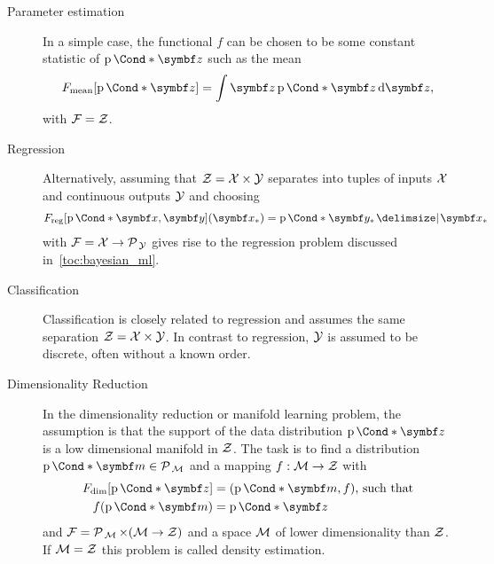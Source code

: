 \begin{problem}
\begin{description}
    \item[Parameter estimation]
          In a simple case, the functional $f$ can be chosen to be some constant statistic of $\Prob*{\mat{z}}$ such as the mean
          \begin{align}
              F_{\text{mean}}[\Prob*{\mat{z}}] = \int \mat{z} \Prob*{\mat{z}} \diff \mat{z},
          \end{align}
          with $\mathcal{F} = \mathcal{Z}$.
    \item[Regression]
          Alternatively, assuming that $\mathcal{Z} = \mathcal{X} \times \mathcal{Y}$ separates into tuples of inputs $\mathcal{X}$ and continuous outputs $\mathcal{Y}$ and choosing
          \begin{align}
              \label{eq:bayesian_ml:f_reg}
              F_{\text{reg}}[\Prob*{\mat{x}, \mat{y}}](\mat{x}_\ast) = \Prob*{\mat{y}_\ast \given \mat{x}_\ast}
          \end{align}
          with $\mathcal{F} = \mathcal{X} \to \operatorname{\mathcal{P}\mkern2mu}_{\mathcal{Y}}$ gives rise to the regression problem discussed in~\cref{toc:bayesian_ml}.
    \item[Classification]
          Classification is closely related to regression and assumes the same separation $\mathcal{Z} = \mathcal{X} \times \mathcal{Y}$.
          In contrast to regression, $\mathcal{Y}$ is assumed to be discrete, often without a known order.
    \item[Dimensionality Reduction]
          In the dimensionality reduction or manifold learning problem, the assumption is that the support of the data distribution $\Prob*{\mat{z}}$ is a low dimensional manifold in $\mathcal{Z}$.
          The task is to find a distribution $\Prob*{\mat{m}} \in \Probs{\Mc}$ and a mapping $f : \mathcal{M} \to \mathcal{Z}$ with
          \begin{equation}
              \begin{split}
                  F_{\text{dim}}[\Prob*{\mat{z}}] & = (\Prob*{\mat{m}}, f)\text{, such that} \\
                  f(\Prob*{\mat{m}})              & = \Prob*{\mat{z}}
              \end{split}
          \end{equation}
          and $\mathcal{F} = \operatorname{\mathcal{P}\mkern2mu}_{\mathcal{M}} \times (\mathcal{M} \to \mathcal{Z})$ and a space $\mathcal{M}$ of lower dimensionality than $\mathcal{Z}$.
          If $\mathcal{M} = \mathcal{Z}$ this problem is called density estimation.
\end{description}
\end{problem}

